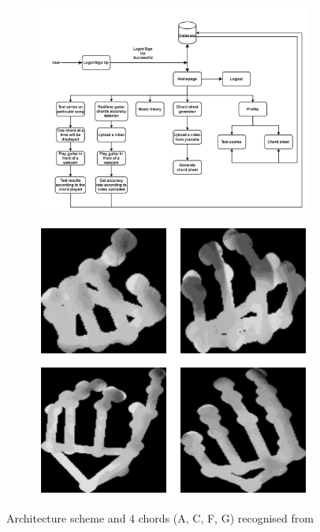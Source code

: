 \begin{figure}[ht]
	\centering
	\begin{subfigure}{0.60\textwidth}
		\centering
		\includegraphics[width=\textwidth]{images/related-work/guitar-guru}
	\end{subfigure}
	\hfill
	\begin{subfigure}{0.39\textwidth}
		\centering
		\includegraphics[width=\textwidth]{images/related-work/guitar-guru-chords}
	\end{subfigure}
	\caption{Architecture scheme and 4 chords (A, C, F, G) recognised from~\protect\cite{guitar-guru}}
	\label{fig:guitar-guru}
\end{figure}

